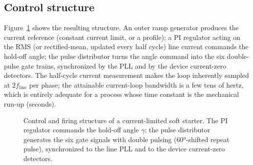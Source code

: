 \subsection{Control structure}

Figure~\ref{softstart:fig:controlbd} shows the resulting structure. An outer ramp
generator produces the current reference (constant current limit, or a
profile); a PI regulator acting on the RMS (or rectified-mean, updated every
half cycle) line current commands the hold-off angle; the pulse distributor
turns the angle command into the six double-pulse gate trains, synchronized
by the PLL and by the device current-zero detectors. The half-cycle current
measurement makes the loop inherently sampled at $2f_\mathrm{line}$ per
phase; the attainable current-loop bandwidth is a few tens of hertz, which
is entirely adequate for a process whose time constant is the mechanical
run-up (seconds).

\begin{figure}[htb]
\centering
{}
\caption{Control and firing structure of a current-limited soft starter.
The PI regulator commands the hold-off angle $\gamma$; the pulse
distributor generates the six gate signals with double pulsing
(\ang{60}-shifted repeat pulse), synchronized to the line PLL and to the
device current-zero detectors.}
\label{softstart:fig:controlbd}
\end{figure}

